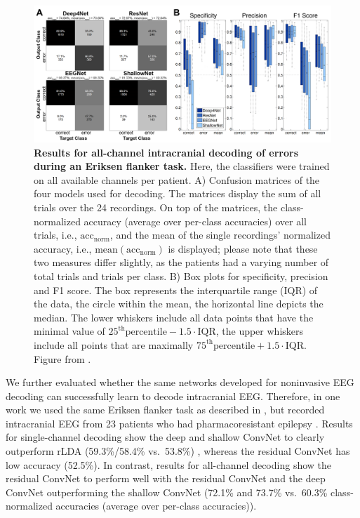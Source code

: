 \begin{figure}[htb]
    \myfloatalign
    \includegraphics[width=1\linewidth]{images/IntracranialError.png}
    \caption[Results for all-channel intracranial decoding of errors during
an Eriksen flanker task]{
\textbf{Results for all-channel intracranial decoding of errors during
an Eriksen flanker task.} Here, the classifiers were trained on all
available channels per patient. A) Confusion matrices of the four models
used for decoding. The matrices display the sum of all trials over the
24 recordings. On top of the matrices, the class-normalized accuracy
(average over per-class accuracies) over all trials, i.e.,
$\mathrm{acc}_\mathrm{norm}$, and the mean of the single recordings'
normalized accuracy, i.e., $\mathrm{mean}(\mathrm{acc}_\mathrm{norm})$
is displayed; please note that these two measures differ slightly, as
the patients had a varying number of total trials and trials per class.
B) Box plots for specificity, precision and F1 score. The box represents
the interquartile range (IQR) of the data, the circle within the mean,
the horizontal line depicts the median. The lower whiskers include all
data points that have the minimal value of
$25^\mathrm{th} \mathrm{percentile}-1.5 \cdot \mathrm{IQR}$, the upper
whiskers include all points that are maximally
$75^\mathrm{th} \mathrm{percentile}+1.5 \cdot \mathrm{IQR}$. Figure
from \citet{volker2018intracranial}.
}
\label{intracranial-error-results-fig}
\end{figure}

    We further evaluated whether the same networks developed for noninvasive
EEG decoding can successfully learn to decode intracranial EEG.
Therefore, in one work we used the same Eriksen flanker task as
described in , but recorded
intracranial EEG from 23 patients who had pharmacoresistant epilepsy
\cite{volker2018intracranial}. Results for single-channel
decoding  show the
deep and shallow ConvNet to clearly outperform rLDA (59.3\%/58.4\%
vs.~53.8\%) , whereas the residual ConvNet has low accuracy (52.5\%). In
contrast, results for all-channel decoding
 show the residual
ConvNet to perform well with the residual ConvNet and the deep ConvNet
outperforming the shallow ConvNet (72.1\% and 73.7\% vs.~60.3\%
class-normalized accuracies (average over per-class accuracies)).

